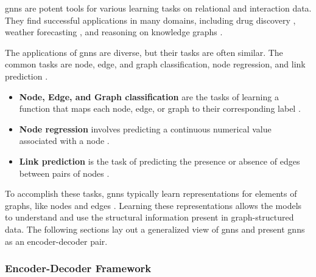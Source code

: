 
\glspl{gnn} are potent tools for various learning tasks on relational and interaction data. They find successful applications in many domains, including drug discovery \cite{dauparas_robust_2022}, weather forecasting \cite{lam_graphcast_2022}, and reasoning on knowledge graphs \cite{huang_few-shot_2022}. 

The applications of \glspl{gnn} are diverse, but their tasks are often similar. The common tasks are node, edge, and graph classification, node regression, and link prediction \cite{wu_comprehensive_2021, zhou_graph_2020}.
\begin{itemize}
    \item \textbf{Node, Edge, and Graph classification} are the tasks of learning a function that maps each node, edge, or graph to their corresponding label \cite{kipf_semi-supervised_2017}.
    \item \textbf{Node regression} involves predicting a continuous numerical value associated with a node \cite{wu_comprehensive_2021}.
    \item \textbf{Link prediction} is the task of predicting the presence or absence of edges between pairs of nodes \cite{liben-nowell_link-prediction_2007}.
\end{itemize}

To accomplish these tasks, \glspl{gnn} typically learn representations for elements of graphs, like nodes and edges \cite{zhou_graph_2020}. Learning these representations allows the models to understand and use the structural information present in graph-structured data. The following sections lay out a generalized view of \glspl{gnn} and present \glspl{gnn} as an encoder-decoder pair.

\subsubsection{Encoder-Decoder Framework}
\label{s_Background_GNNs_EncoderDecoderFramework}

